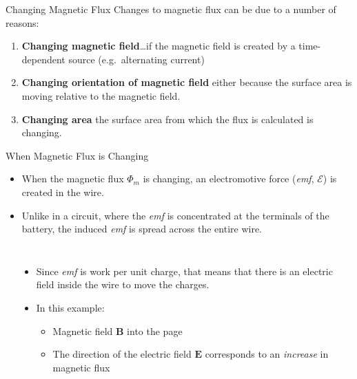 \documentclass[12pt,aspectratio=169]{beamer}
\begin{document}
\begin{frame}{Changing Magnetic Flux}
  Changes to magnetic flux can be due to a number of reasons:
  \begin{enumerate}
  \item\textbf{Changing magnetic field}\ldots if the magnetic field is created
    by a time-dependent source (e.g.\ alternating current)
  \item\textbf{Changing orientation of magnetic field} either because the
    surface area is moving relative to the magnetic field.
  \item\textbf{Changing area} the surface area from which the flux is
    calculated is changing.
  \end{enumerate}
\end{frame}


\begin{frame}{When Magnetic Flux is Changing}
  \begin{itemize}
  \item When the magnetic flux $\Phi_m$ is changing, an electromotive force
    (\emph{emf}, $\mathcal{E}$) is created in the wire.
  \item Unlike in a circuit, where the \emph{emf} is concentrated at the
    terminals of the battery, the induced \emph{emf} is spread across the
    entire wire.
  \end{itemize}
  \begin{columns}
    \begin{center}
    \end{center}
    
    \begin{itemize}
    \item Since \emph{emf} is work per unit charge, that means that there is an
      electric field inside the wire to move the charges.
    \item In this example:
      \begin{itemize}
      \item Magnetic field $\bm{B}$ into the page
      \item The direction of the electric field $\bm{E}$ corresponds to an
        \emph{increase} in magnetic flux
      \end{itemize}
    \end{itemize}
  \end{columns}
\end{frame}
\end{document}

